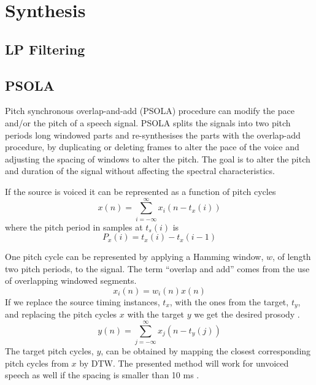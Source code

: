 


\section{Synthesis} %
\label{sec:synthesis}

\subsection{LP Filtering} %
\label{sub:lp_filtering}

\subsection{PSOLA} %
\label{sub:psola}
Pitch synchronous overlap-and-add (PSOLA) procedure can modify the pace and/or the pitch of a speech signal. PSOLA splits the signals into two pitch periods long windowed parts and re-synthesises the parts with the overlap-add procedure, by duplicating or deleting frames to alter the pace of the voice and adjusting the spacing of windows to alter the pitch. The goal is to alter the pitch and duration of the signal without affecting the spectral characteristics. 

If the source is voiced it can be represented as a function of pitch cycles
\begin{equation}
	x(n)=\sum_{i=-\infty}^{\infty}x_i(n-t_x(i))
\end{equation}
where the pitch period in samples at $t_s(i)$ is
\begin{equation}
	P_x(i)=t_x(i)-t_x(i-1)
\end{equation}

One pitch cycle can be represented by applying a Hamming window, $w$, of length two pitch periods, to the signal. The term ``overlap and add'' comes from the use of overlapping windowed segments.
\begin{equation}
	x_i(n)=w_i(n)x(n)
\end{equation}
If we replace the source timing instances, $t_x$, with the ones from the target, $t_y$, and replacing the pitch cycles $x$ with the target $y$ we get the desired prosody \cite{taletek}.
\begin{equation}
	y(n)=\sum_{j=-\infty}^{\infty}x_j(n-t_y(j)) %
\end{equation}
The target pitch cycles, $y$, can be obtained by mapping the closest corresponding pitch cycles from $x$ by \eg DTW. The presented method will work for unvoiced speech as well if the spacing is smaller than 10 ms \cite{taletek}. 
\cite{moulines95}


